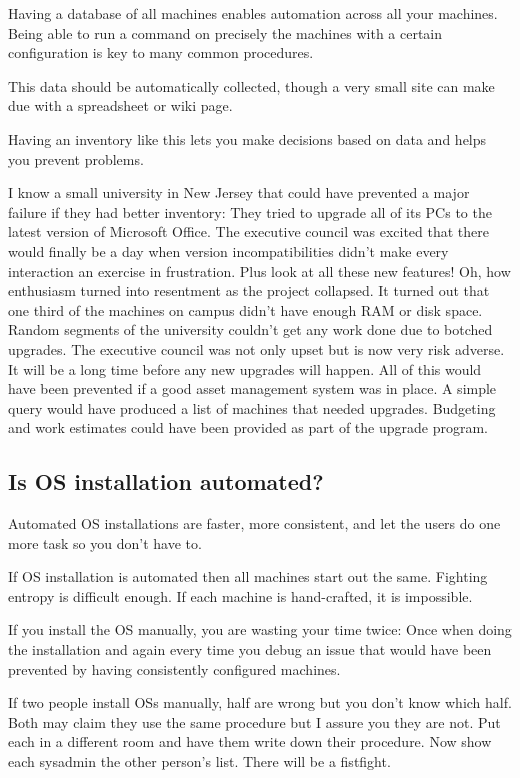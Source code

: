 \documentclass{article}
\begin{document}
Having a database of all machines enables automation across all your machines. Being able to run a command on precisely the machines with a certain configuration is key to many common procedures.

This data should be automatically collected, though a very small site can make due with a spreadsheet or wiki page.

Having an inventory like this lets you make decisions based on data and helps you prevent problems.

I know a small university in New Jersey that could have prevented a major failure if they had better inventory: They tried to upgrade all of its PCs to the latest version of Microsoft Office. The executive council was excited that there would finally be a day when version incompatibilities didn't make every interaction an exercise in frustration. Plus look at all these new features! Oh, how enthusiasm turned into resentment as the project collapsed. It turned out that one third of the machines on campus didn't have enough RAM or disk space. Random segments of the university couldn't get any work done due to botched upgrades. The executive council was not only upset but is now very risk adverse. It will be a long time before any new upgrades will happen. All of this would have been prevented if a good asset management system was in place. A simple query would have produced a list of machines that needed upgrades. Budgeting and work estimates could have been provided as part of the upgrade program.

\subsection{Is OS installation automated?}
Automated OS installations are faster, more consistent, and let the users do one more task so you don't have to.

If OS installation is automated then all machines start out the same. Fighting entropy is difficult enough. If each machine is hand-crafted, it is impossible.

If you install the OS manually, you are wasting your time twice: Once when doing the installation and again every time you debug an issue that would have been prevented by having consistently configured machines.

If two people install OSs manually, half are wrong but you don't know which half. Both may claim they use the same procedure but I assure you they are not. Put each in a different room and have them write down their procedure. Now show each sysadmin the other person's list. There will be a fistfight.
\end{document}
